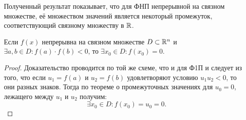 \documentclass[../../main.tex]{subfiles}
\begin{document}
	\begin{rem}
		Полученный результат показывает, что для ФНП непрерывной на связном
		множестве, её множеством значений является некоторый промежуток,
		соответствующий связному множеству в $\mathbb{R}$.
	\end{rem}
	
    \begin{crl*}
			Если $f(x)$ непрерывна на связном множестве $D \subset \mathbb{R}^n$ и $\exists a,b 
			\in D: 
			f(a) \cdot f(b) < 0$, то $\exists x_0 \in D : f(x_0) = 0.$
	\end{crl*}
	
    \begin{proof}
    	Доказательство проводится по той же схеме, что и для Ф1П и следует из 
    	того, что если $u_1 = f(a)$ и $u_2 = f(b)$ 
    	удовлетворяют условию $u_1u_2 < 0$, то 
    	они разных знаков. Тогда по теореме о промежуточных значениях для 
    	$u_0 = 0$, лежащего между $u_1$ и $u_2$ получим:
    	\[\exists x_0 \in D: f(x_0) = u_0 = 0.\] 
    \end{proof}
	
\end{document}
